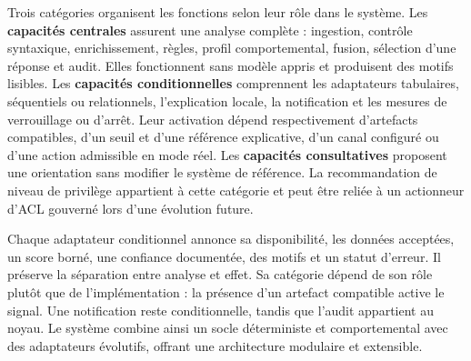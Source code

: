 \documentclass[11pt,a4paper,oneside]{report}
\theoremstyle{definition}
\theoremstyle{plain}
\begin{document}
Trois catégories organisent les fonctions selon leur rôle dans le système.
Les \textbf{capacités centrales} assurent une analyse complète : ingestion,
contrôle syntaxique, enrichissement, règles, profil comportemental, fusion,
sélection d'une réponse et audit. Elles fonctionnent sans modèle appris et
produisent des motifs lisibles. Les \textbf{capacités conditionnelles}
comprennent les adaptateurs tabulaires, séquentiels ou relationnels,
l'explication locale, la notification et les mesures de verrouillage ou
d'arrêt. Leur activation dépend respectivement d'artefacts compatibles, d'un
seuil et d'une référence explicative, d'un canal configuré ou d'une action
admissible en mode réel. Les \textbf{capacités consultatives} proposent une
orientation sans modifier le système de référence. La recommandation de niveau
de privilège appartient à cette catégorie et peut être reliée à un actionneur
d'ACL gouverné lors d'une évolution future.

Chaque adaptateur conditionnel annonce sa disponibilité, les données acceptées,
un score borné, une confiance documentée, des motifs et un statut d'erreur. Il
préserve la séparation entre analyse et effet. Sa catégorie dépend de son rôle
plutôt que de l'implémentation : la présence d'un artefact compatible active
le signal. Une notification reste conditionnelle, tandis que l'audit appartient
au noyau. Le système combine ainsi un socle déterministe et comportemental avec
des adaptateurs évolutifs, offrant une architecture modulaire et extensible.
\end{document}
